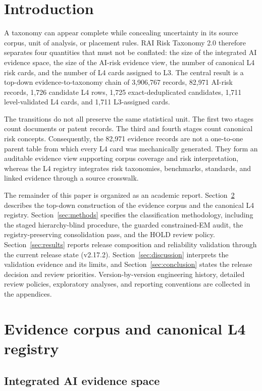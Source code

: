 \documentclass[11pt,a4paper]{article}
\begin{document}
\section{Introduction}
\label{sec:intro}

A taxonomy can appear complete while concealing uncertainty in its source
corpus, unit of analysis, or placement rules. RAI Risk Taxonomy 2.0 therefore
separates four quantities that must not be conflated: the size of the integrated
AI evidence space, the size of the AI-risk evidence view, the number of
canonical L4 risk cards, and the number of L4 cards assigned to L3. The central
result is a top-down evidence-to-taxonomy chain of 3,906,767 records, 82,971
AI-risk records, 1,726 candidate L4 rows, 1,725 exact-deduplicated candidates,
1,711 level-validated L4 cards, and 1,711 L3-assigned cards.

The transitions do not all preserve the same statistical unit. The first two
stages count documents or patent records. The third and fourth stages count
canonical risk concepts. Consequently, the 82,971 evidence records are not a
one-to-one parent table from which every L4 card was mechanically generated.
They form an auditable evidence view supporting corpus coverage and risk
interpretation, whereas the L4 registry integrates risk taxonomies, benchmarks,
standards, and linked evidence through a source crosswalk.


The remainder of this paper is organized as an academic report. Section~\ref{sec:data}
describes the top-down construction of the evidence corpus and the canonical L4
registry. Section~\ref{sec:methods} specifies the classification methodology,
including the staged hierarchy-blind procedure, the guarded constrained-EM audit,
the registry-preserving consolidation pass, and the HOLD review policy.
Section~\ref{sec:results} reports release composition and reliability validation
through the current release state (v2.17.2). Section~\ref{sec:discussion}
interprets the validation evidence and its limits, and Section~\ref{sec:conclusion}
states the release decision and review priorities. Version-by-version engineering
history, detailed review policies, exploratory analyses, and reporting conventions
are collected in the appendices.

\section{Evidence corpus and canonical L4 registry}
\label{sec:data}

\subsection{Integrated AI evidence space}
\end{document}

